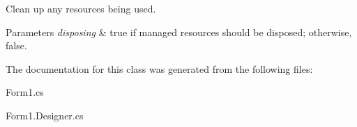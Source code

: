 Clean up any resources being used. 


\begin{DoxyParams}{Parameters}
{\em disposing} & true if managed resources should be disposed; otherwise, false.\\
\hline
\end{DoxyParams}


The documentation for this class was generated from the following files\+:\begin{DoxyCompactItemize}
\item 
Form1.\+cs\item 
Form1.\+Designer.\+cs\end{DoxyCompactItemize}
